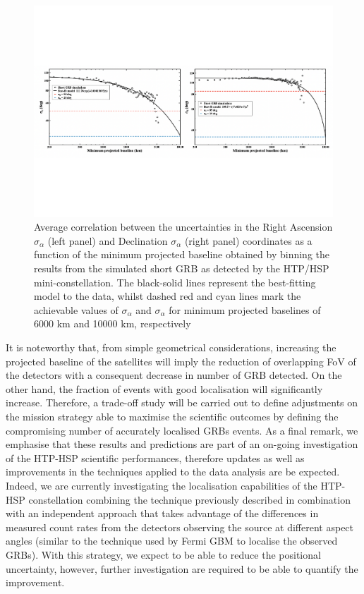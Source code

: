 \documentclass[]{spie}  %
\begin{document}
\begin{figure}[h!]
\centering
\includegraphics[scale=0.45,angle=0]{fig_all_pos_short_reb}
\vspace{-2.5cm}
\caption{Average correlation between the uncertainties in the Right Ascension $\sigma_\alpha$ (left panel) and Declination $\sigma_\alpha$ (right panel) coordinates as a function of the minimum projected baseline obtained by binning the results from the simulated short GRB as detected by the HTP/HSP mini-constellation. The black-solid lines represent the best-fitting model to the data, whilst dashed red and cyan lines mark the achievable values of $\sigma_\alpha$ and $\sigma_\alpha$ for minimum projected baselines of 6000 km and 10000 km, respectively} 
\label{fig:all_pos_short_reb}
\end{figure}

It is noteworthy that, from simple geometrical considerations, increasing the projected baseline of the satellites will imply the reduction of overlapping FoV of the detectors with a consequent decrease in number of GRB detected. On the other hand, the fraction of events with good localisation will significantly increase. Therefore, a trade-off study will be carried out to define adjustments on the mission strategy able to maximise the scientific outcomes by defining the compromising number of accurately localised GRBs events.
As a final remark, we emphasise that these results and predictions are part of an on-going investigation of the HTP-HSP scientific performances, therefore updates as well as improvements in the techniques applied to the data analysis are be expected. Indeed, we are currently investigating the localisation capabilities of the HTP-HSP constellation combining the technique previously described in combination with an independent approach that takes advantage of the differences in measured count rates from the detectors observing the source at different aspect angles (similar to the technique used by Fermi GBM to localise the observed GRBs). With this strategy, we expect to be able to reduce the positional uncertainty, however, further investigation are required to be able to quantify the improvement.
\end{document}
